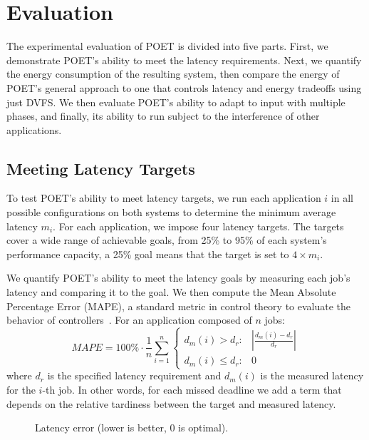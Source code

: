 \section{Evaluation}
\label{sec:poet-evaluation}

The experimental evaluation of POET is divided into five parts.
First, we demonstrate POET's ability to meet the latency requirements.
Next, we quantify the energy consumption of the resulting system, then compare the energy of POET's general approach to one that controls latency and energy tradeoffs using just DVFS.
We then evaluate POET's ability to adapt to input with multiple phases, and finally, its ability to run subject to the interference of other applications.


\subsection{Meeting Latency Targets}
\label{sec:poet-eval-performance}

To test POET's ability to meet latency targets, we run each application $i$ in all possible configurations on both systems to determine the minimum average latency $m_i$.
For each application, we impose four latency targets.
The targets cover a wide range of achievable goals, from 25\% to 95\% of each system's performance capacity, \ie a 25\% goal means that the target is set to $4 \times m_i$.

We quantify POET's ability to meet the latency goals by measuring each job's latency and comparing it to the goal.
We then compute the Mean Absolute Percentage Error (MAPE), a standard metric in control theory to evaluate the behavior of controllers~\cite{ICSE2014}.
For an application composed of $n$ jobs:
\begin{equation}
MAPE = 100\% \cdot \frac{1}{n} \sum\limits_{i=1}^{n} 
\left \{
\begin{array}{ll}
d_m(i) > d_{r}  :& \left|\frac{d_m(i) - d_{r}}{d_r} \right| \\
d_m(i) \le d_{r}  :& 0
\end{array} \right.
\end{equation}
where $d_r$ is the specified latency requirement and $d_m(i)$ is the measured latency for the $i$-th job.
In other words, for each missed deadline we add a term that depends on the relative tardiness between the target and measured latency.

\begin{figure}[t]
  \centering
    
  \caption{Latency error (lower is better, 0 is optimal).}
  \label{fig:poet-mape}
\end{figure}

